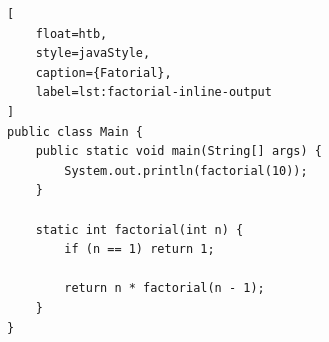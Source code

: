 \begin{lstlisting}[
    float=htb,
    style=javaStyle,
    caption={Fatorial},
    label=lst:factorial-inline-output
]
public class Main {
    public static void main(String[] args) {
        System.out.println(factorial(10));
    }

    static int factorial(int n) {
        if (n == 1) return 1;

        return n * factorial(n - 1);
    }
}
\end{lstlisting}
